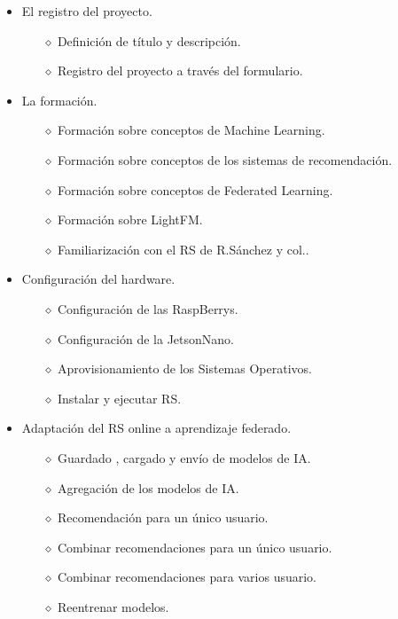 \begin{itemize}
    \item El registro del proyecto. 
        \begin{itemize}
            \item [$\diamond$]Definición de título y descripción.
            \item [$\diamond$]Registro del proyecto a través del formulario.
        \end{itemize}
    \item La formación.
        \begin{itemize}
            \item [$\diamond$]Formación sobre conceptos de Machine Learning.
            \item [$\diamond$]Formación sobre conceptos de los sistemas de recomendación.
            \item [$\diamond$]Formación sobre conceptos de Federated Learning.
            \item [$\diamond$]Formación sobre LightFM.
            \item [$\diamond$]Familiarización con el RS de R.Sánchez y col..
        \end{itemize}
    \item Configuración del hardware.
        \begin{itemize}
            \item [$\diamond$]Configuración de las RaspBerrys.
            \item [$\diamond$]Configuración de la JetsonNano.
            \item [$\diamond$]Aprovisionamiento de los Sistemas Operativos.
            \item [$\diamond$]Instalar y ejecutar RS.
        \end{itemize}
    \item Adaptación del RS online a aprendizaje federado.
        \begin{itemize}
            \item [$\diamond$]Guardado , cargado y envío de modelos de IA.
            \item [$\diamond$]Agregación de los modelos de IA.
            \item [$\diamond$]Recomendación para un único usuario.
            \item [$\diamond$]Combinar recomendaciones para un único usuario.
            \item [$\diamond$]Combinar recomendaciones para varios usuario.
            \item [$\diamond$]Reentrenar modelos.

\end{itemize}
\end{itemize}

